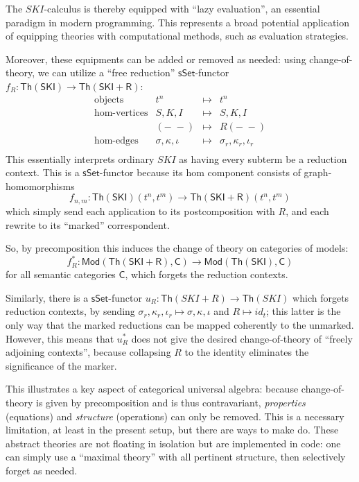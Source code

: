 \documentclass{amsart}
\theoremstyle{definition}
\newcommand{\sSet}{\mathsf{sSet}}
\newcommand{\Th}{\mathsf{Th}}
\newcommand{\Mod}{\mathsf{Mod}}
\newcommand{\C}{\mathsf{C}}
\newcommand{\maps}{\colon}
\begin{document}
The $SKI$-calculus is thereby equipped with ``lazy evaluation'', an essential paradigm in modern programming. This represents a broad potential application of equipping theories with computational methods, such as evaluation strategies.

Moreover, these equipments can be added or removed as needed: using change-of-theory, we can utilize a ``free reduction'' $\sSet$-functor $f_R\maps\Th(\mathsf{SKI})\to \Th(\mathsf{SKI}+\mathsf{R})$:
\[\begin{array}{rrcl}
\text{objects} & t^n & \mapsto & t^n\\
\text{hom-vertices} & S,K,I & \mapsto & S,K,I\\
& (-\; -) & \mapsto & R(-\; -)\\
\text{hom-edges} & \sigma, \kappa, \iota & \mapsto & \sigma_r, \kappa_r, \iota_r\\
\end{array}\]
This essentially interprets ordinary $SKI$ as having every subterm be a reduction context. This is a $\sSet$-functor because its hom component consists of graph-homomorphisms $$f_{n,m}\maps \Th(\mathsf{SKI})(t^n,t^m) \to \Th(\mathsf{SKI}+\mathsf{R})(t^n,t^m)$$ which simply send each application to its postcomposition with $R$, and each rewrite to its ``marked'' correspondent.

So, by precomposition this induces the change of theory on categories of models: 
\[   f_R^*\maps \Mod(\Th(\mathsf{SKI} + \mathsf{R}),\C) \to \Mod(\Th(\mathsf{SKI}),\C) \]
for all semantic categories $\C$, which forgets the reduction contexts.

Similarly, there is a $\sSet$-functor $u_R\maps \Th(SKI+R)\to \Th(SKI)$ which forgets reduction contexts, by sending $\sigma_r,\kappa_r,\iota_r \mapsto\sigma, \kappa,\iota$ and $R \mapsto id_t$; this latter is the only way that the marked reductions can be mapped coherently to the unmarked. However, this means that $u_R^*$ does not give the desired change-of-theory of ``freely adjoining contexts'', because collapsing $R$ to the identity eliminates the significance of the marker.

This illustrates a key aspect of categorical universal algebra: because change-of-theory is given by precomposition and is thus contravariant, \textit{properties} (equations) and \textit{structure} (operations) can only be removed. This is a necessary limitation, at least in the present setup, but there are ways to make do. These abstract theories are not floating in isolation but are implemented in code: one can simply use a ``maximal theory'' with all pertinent structure, then selectively forget as needed.
\end{document}
